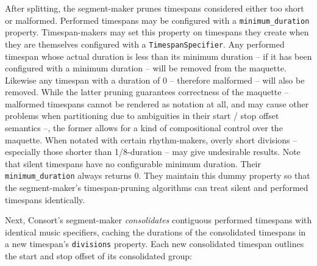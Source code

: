 \noindent After splitting, the segment-maker prunes timespans considered either
too short or malformed. Performed timespans may be configured with a
\texttt{minimum\_duration} property. Timespan-makers may set this property on
timespans they create when they are themselves configured with a
\texttt{TimespanSpecifier}. Any performed timespan whose actual duration is
less than its minimum duration -- if it has been configured with a minimum
duration -- will be removed from the maquette. Likewise any timespan with a
duration of 0 -- therefore malformed -- will also be removed. While the latter
pruning guarantees correctness of the maquette -- malformed timespans cannot be
rendered as notation at all, and may cause other problems when partitioning due
to ambiguities in their start / stop offset semantics --, the former allows for
a kind of compositional control over the maquette. When notated with certain
rhythm-makers, overly short divisions -- especially those shorter than
1/8-duration -- may give undesirable results. Note that silent timespans have
no configurable minimum duration. Their \texttt{minimum\_duration} always
returns 0. They maintain this dummy property so that the segment-maker's
timespan-pruning algorithms can treat silent and performed timespans
identically.

Next, Consort's segment-maker \emph{consolidates} contiguous performed
timespans with identical music specifiers, caching the durations of the
consolidated timespans in a new timespan's \texttt{divisions} property. Each
new consolidated timespan outlines the start and stop offset of its
consolidated group:

\begin{comment}
<abjad>
timespans = timespantools.TimespanInventory([
    consort.PerformedTimespan(
        start_offset=0,
        stop_offset=10,
        music_specifier='foo',
        ),
    consort.PerformedTimespan(
        start_offset=10,
        stop_offset=20,
        music_specifier='foo',
        ),
    consort.PerformedTimespan(
        start_offset=20,
        stop_offset=25,
        music_specifier='bar',
        ),
    consort.PerformedTimespan(
        start_offset=40,
        stop_offset=50,
        music_specifier='bar',
        ),
    consort.PerformedTimespan(
        start_offset=50,
        stop_offset=58,
        music_specifier='bar',
        ),
    ])
show(timespans)
timespans = consort.SegmentMaker.consolidate_timespans(timespans)
show(timespans)
</abjad>
\end{comment}

